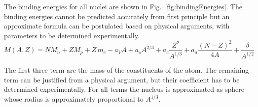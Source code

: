 \documentclass[12pt]{article}
\begin{document}
The binding energies for all nuclei are shown in Fig.~\ref{fig:bindingEnergies}. The binding energies cannot be predicted accurately from first principle but an approximate formula can be postulated based on physical arguments, with parameters to be determined experimentally. 
\begin{equation}\label{eq:SEMF}
M(A,Z)=N M_n+Z M_p+Z\, m_e-a_V A + a_sA^{2/3}+a_c\frac{Z^2}{A^{1/3}}+a_a\frac{(N-Z)^2}{4A}+\frac{\delta}{A^{1/2}}
\end{equation}  


The first three term are the mass of the constituents of the atom. The remaining term can be justified from a physical argument, but their coefficient has to be determined experimentally. For all terms the nucleus is approximated as sphere whose radius is approximately proportional to $A^{1/3}$.
\end{document}

